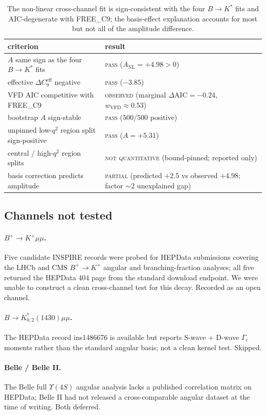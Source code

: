 \begin{table}[h]
\centering
\small
\begin{tabular}{p{6.5cm}p{8.0cm}}
\toprule
criterion & result \\
\midrule
$A$ same sign as the four $B\to K^{*}$ fits & \textsc{pass} ($A_{\mathrm{NL}}=+4.98>0$) \\
effective $\Delta C_{9}^{\mathrm{eff}}$ negative & \textsc{pass} ($-3.85$) \\
VFD AIC competitive with FREE\_C9   & \textsc{observed} (marginal $\Delta\mathrm{AIC}=-0.24$, $w_{\mathrm{VFD}}\approx 0.53$) \\
bootstrap $A$ sign-stable           & \textsc{pass} ($500/500$ positive) \\
unpinned low-$q^{2}$ region split sign-positive & \textsc{pass} ($A=+5.31$) \\
central / high-$q^{2}$ region splits & \textsc{not quantitative} (bound-pinned; reported only) \\
basis correction predicts amplitude & \textsc{partial} (predicted $+2.5$ vs observed $+4.98$; factor $\sim 2$ unexplained gap) \\
\bottomrule
\end{tabular}
\caption{The non-linear cross-channel fit is sign-consistent with the
four $B\to K^{*}$ fits and AIC-degenerate with FREE\_C9; the
basis-effect explanation accounts for most but not all of the
amplitude difference.}
\end{table}

\subsection{Channels not tested}

\paragraph{$B^{+}\to K^{+}\mu\mu$.} Five candidate INSPIRE records were
probed for HEPData submissions covering the LHCb and CMS $B^{+}\to
K^{+}$ angular and branching-fraction analyses; all five returned the
HEPData 404 page from the standard download endpoint. We were unable
to construct a clean cross-channel test for this decay. Recorded as
an open channel.

\paragraph{$B \to K_{0,2}^{*}(1430)\mu\mu$.} The HEPData record
ins1486676 \citep{LHCb2016Kst0214030HEPData} is available but reports
S-wave + D-wave $\Gamma_{i}$ moments rather than the standard angular
basis; not a clean kernel test. Skipped.

\paragraph{Belle / Belle II.} The Belle full $\Upsilon(4S)$ angular
analysis lacks a published correlation matrix on HEPData; Belle II had
not released a cross-comparable angular dataset at the time of writing.
Both deferred.
